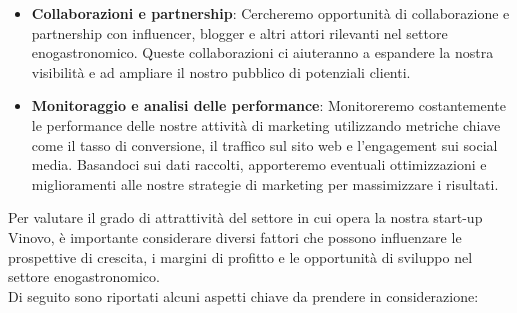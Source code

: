 \documentclass[12pt, a4paper]{article}
\begin{document}
\begin{itemize}
    \item \textbf{Collaborazioni e partnership}: Cercheremo opportunità di collaborazione e partnership con influencer, blogger e altri attori rilevanti nel settore enogastronomico. Queste collaborazioni ci aiuteranno a espandere la nostra visibilità e ad ampliare il nostro pubblico di potenziali clienti.
    \item \textbf{Monitoraggio e analisi delle performance}: Monitoreremo costantemente le performance delle nostre attività di marketing utilizzando metriche chiave come il tasso di conversione, il traffico sul sito web e l'engagement sui social media. Basandoci sui dati raccolti, apporteremo eventuali ottimizzazioni e miglioramenti alle nostre strategie di marketing per massimizzare i risultati.
\end{itemize}\bigskip
Per valutare il grado di attrattività del settore in cui opera la nostra start-up Vinovo, è importante considerare diversi fattori che possono influenzare le prospettive di crescita, i margini di profitto e le opportunità di sviluppo nel settore enogastronomico.\\
Di seguito sono riportati alcuni aspetti chiave da prendere in considerazione:
\end{document}
